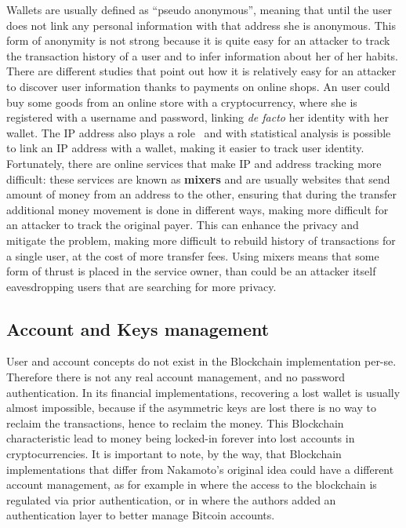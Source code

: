 Wallets are usually defined as ``pseudo anonymous'', meaning that until the
user does not link any personal information with that address she is anonymous.
This form of anonymity is not strong because it is quite easy for an attacker to
track the transaction history of a user and to infer information about her of
her habits.
There are different studies \cite{guadamuz15} that point out how it is
relatively easy for an attacker to discover user information thanks
to payments on online shops. An user could buy some goods from an online store
with a cryptocurrency, where she is registered with a username and password,
linking \textit{de facto} her identity with her wallet.
The IP address also plays a role~\cite{koshy14} and with statistical analysis
is possible to link an IP address with a wallet, making it easier to track user
identity.
Fortunately, there are online services that make IP and address tracking more
difficult: these services are known as \textbf{mixers} and are usually websites
that send amount of money from an address to the other, ensuring that during the
transfer additional money movement is done in different ways, making more
difficult for an attacker to track the original payer. This can enhance the
privacy and mitigate the problem, making more difficult to rebuild history of
transactions for a single user, at the cost of more transfer fees. Using mixers
means that some form of thrust is placed in the service owner, than could be an
attacker itself eavesdropping users that are searching for more privacy.

\subsection{Account and Keys management}

User and account concepts do not exist in the Blockchain implementation per-se.
Therefore there is not any real account management, and no password
authentication. In its financial implementations, recovering a lost wallet is
usually almost impossible, because if the asymmetric keys are lost there is no
way to reclaim the transactions, hence to reclaim the money. This Blockchain
characteristic lead to money being locked-in forever into lost accounts in
cryptocurrencies.
It is important to note, by the way, that Blockchain implementations that differ
from Nakamoto's original idea could have a different account management, as for
example in\cite{azaria16} where the access to the blockchain is regulated via
prior authentication, or in\cite{zhou16} where the authors added an
authentication layer to better manage Bitcoin accounts.


